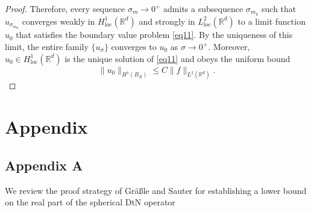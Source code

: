\documentclass[12pt,reqno]{amsart}
\numberwithin{equation}{section}
\begin{document}
\begin{proof}
Therefore, every sequence $\sigma_m \to 0^+$ admits a subsequence $\sigma_{m_k}$ such that $u_{\sigma_{m_k}}$ converges weakly in $H^1_{\mathrm{loc}}(\mathbb{R}^d)$ and strongly in $L^2_{\mathrm{loc}}(\mathbb{R}^d)$ to a limit function $u_0$ that satisfies the boundary value problem \eqref{eq11}. By the uniqueness of this limit, the entire family $\{u_\sigma\}$ converges to $u_0$ as $\sigma \to 0^+$. Moreover, $u_0 \in H^1_{\mathrm{loc}}(\mathbb{R}^d)$ is the unique solution of \eqref{eq11} and obeys the uniform bound
\begin{equation*}
    \|u_0\|_{H^1(B_R)} \le C \|f\|_{L^2(\mathbb{R}^d)}.
\end{equation*}




	
\end{proof}








\section{Appendix}\label{sec5}
\subsection{Appendix A}\label{appendixA}
We review the proof strategy of Gräßle and Sauter \cite[Theorem 3.4]{gräßle2025} for establishing a lower bound on the real part of the spherical DtN operator
\end{document}
